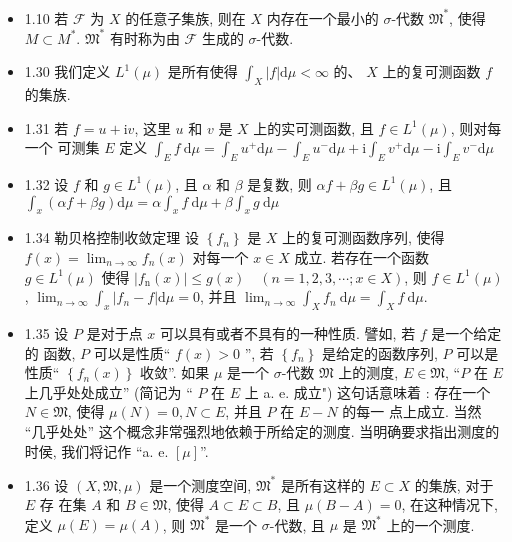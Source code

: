 \begin{itemize}
\item 1.10 若 $\mathscr{F}$ 为 $X$ 的任意子集族, 则在 $X$ 内存在一个最小的 $\sigma$-代数 $\mathfrak{M}^{*}$, 使得 $M \subset M^{*}$. $\mathfrak{M}^{*}$ 有时称为由 $\mathscr{F}$ 生成的 $\sigma$-代数.

\item 1.30 我们定义 $L^{1}(\mu)$ 是所有使得 $\int_{X}|f| \mathrm{d} \mu<\infty$ 的、 $X$ 上的复可测函数 $f$ 的集族.

\item 1.31 若 $f=u+\mathrm{i} v$, 这里 $u$ 和 $v$ 是 $X$ 上的实可测函数, 且 $f \in L^{1}(\mu)$, 则对每一个 可测集 $E$ 定义 $\int_{E} f \mathrm{~d} \mu=\int_{E} u^{+} \mathrm{d} \mu-\int_{E} u^{-} \mathrm{d} \mu+\mathrm{i} \int_{E} v^{+} \mathrm{d} \mu-\mathrm{i} \int_{E} v^{-} \mathrm{d} \mu$

\item 1.32 设 $f$ 和 $g \in L^{1}(\mu)$, 且 $\alpha$ 和 $\beta$ 是复数, 则 $\alpha f+\beta g \in L^{1}(\mu)$, 且 $\int_{x}(\alpha f+\beta g) \mathrm{d} \mu=\alpha \int_{x} f \mathrm{~d} \mu+\beta \int_{x} g \mathrm{~d} \mu$

\item 1.34 勒贝格控制收敛定理 设 $\left\{f_{n}\right\}$ 是 $X$ 上的复可测函数序列, 使得 $f(x)=\lim _{n \rightarrow \infty} f_{n}(x)$ 对每一个 $x \in X$ 成立. 若存在一个函数 $g \in L^{1}(\mu)$ 使得 $\left|f_{\mathrm{n}}(x)\right| \leqslant g(x) \quad(n=1,2,3, \cdots ; x \in X)$, 则 $f \in L^{1}(\mu)$, $\lim _{n \rightarrow \infty} \int_{x}\left|f_{n}-f\right| \mathrm{d} \mu=0$, 并且 $\lim _{n \rightarrow \infty} \int_{X} f_{n} \mathrm{~d} \mu=\int_{X} f \mathrm{~d} \mu$.

\item 1.35 设 $P$ 是对于点 $x$ 可以具有或者不具有的一种性质. 譬如, 若 $f$ 是一个给定的 函数, $P$ 可以是性质“ $f(x)>0$ ”, 若 $\left\{f_{n}\right\}$ 是给定的函数序列, $P$ 可以是性质“ $\left\{f_{n}(x)\right\}$ 收敛”. 如果 $\mu$ 是一个 $\sigma$-代数 $\mathfrak{M}$ 上的测度, $E \in \mathfrak{M}$, “$P$ 在 $E$ 上几乎处处成立” (简记为 “ $P$ 在 $E$ 上 a. e. 成立") 这句话意味着 : 存在一个 $N \in \mathfrak{M}$, 使得 $\mu(N)=0, N \subset E$, 并且 $P$ 在 $E-N$ 的每一 点上成立. 当然 “几乎处处” 这个概念非常强烈地依赖于所给定的测度. 当明确要求指出测度的 时侯, 我们将记作 “a. e. $[\mu]$”.

\item 1.36 设 $(X, \mathfrak{M}, \mu)$ 是一个测度空间, $\mathfrak{M}^*$  是所有这样的 $E \subset X$ 的集族, 对于 $E$ 存 在集 $A$ 和 $B \in \mathfrak{M}$, 使得 $A \subset E \subset B$, 且 $\mu(B-A)=0$, 在这种情况下, 定义 $\mu(E)=\mu(A)$, 则 $\mathfrak{M}^{*}$ 是一个 $\sigma$-代数, 且 $\mu$ 是 $\mathfrak{M}^{*}$ 上的一个测度.


\end{itemize}
